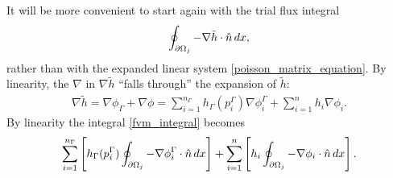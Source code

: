 It will be more convenient to start again with the trial flux integral
\newcommand{\fvmintegral}{
\oint_{\pom_j} -\nabla \tilde{h}\cdot\hat{n}\,dx
}
\begin{equation}\label{fvm_integral}
\fvmintegral,
\end{equation}
rather than with the expanded linear system \eqref{poisson_matrix_equation}.
By linearity, the $\nabla$ in $\nabla\tilde{h}$ ``falls through'' the expansion of $\tilde{h}$:
\begin{align*}
    \nabla \tilde{h} = \nabla\phi_\Gamma + \nabla\phi
             = \sum_{i=1}^{n_\Gamma}h_\Gamma(p^\Gamma_i)\nabla\phi^\Gamma_i + \sum_{i=1}^n h_i\nabla\phi_i.
\end{align*}
By linearity the integral \eqref{fvm_integral} becomes
\begin{equation}\label{fvm_integral_linearity_expanded}
    \sum_{i=1}^{n_\Gamma}\left[h_\Gamma(p^\Gamma_i)\oint_{{\partial\Omega}_j}-\nabla\phi^\Gamma_i\cdot\hat{n}\,dx\right]
    + \sum_{i=1}^n\left[h_i\oint_{{\partial\Omega}_j}-\nabla\phi_i\cdot\hat{n}\,dx\right].
\end{equation}


